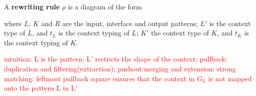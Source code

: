     \begin{definition}
      \label{def:pbpop:rule}
      A \pbpop \textbf{rewriting rule} \(\rho\) is a diagram of the form
    \begin{center}
    
    \end{center}
    
    \noindent where \(L\), \(K\) and \(R\) are the input, interface and output patterns; \(L'\) is the context type of $L$, and \(t_L\) is the context typing of $L$; \(K'\) the context type of $K$, and \(t_K\) is the context typing of $K$. 
    \end{definition} 
    \textcolor{red}{intuition:
    L is the pattern; L' restricts the shape of the context; pullback: duplication and filtering(extraction); pushout:merging and extension; strong matching: leftmost pullback square ensures that the context in $G_L$ is not mapped onto the pattern L in L'
    }
    
